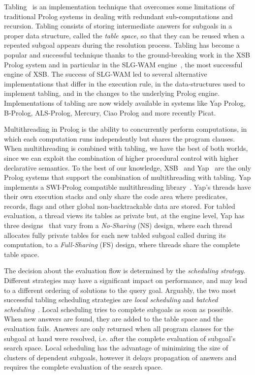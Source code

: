 \documentclass{llncs}
\begin{document}
Tabling~\cite{Chen-96} is an implementation technique that overcomes
some limitations of traditional Prolog systems in dealing with
redundant sub-computations and recursion. Tabling consists of storing
intermediate answers for subgoals in a proper data structure, called
the \emph{table space}, so that they can be reused when a repeated
subgoal appears during the resolution process. Tabling has become a
popular and successful technique thanks to the ground-breaking work in
the XSB Prolog system and in particular in the SLG-WAM
engine~\cite{Sagonas-98}, the most successful engine of XSB. The
success of SLG-WAM led to several alternative implementations that
differ in the execution rule, in the data-structures used to implement
tabling, and in the changes to the underlying Prolog
engine. Implementations of tabling are now widely available in systems
like Yap Prolog, B-Prolog, ALS-Prolog, Mercury, Ciao Prolog and more
recently Picat.

Multithreading in Prolog is the ability to concurrently perform
computations, in which each computation runs independently but shares
the program clauses. When multithreading is combined with tabling, we
have the best of both worlds, since we can exploit the combination of
higher procedural control with higher declarative semantics. To the
best of our knowledge, XSB~\cite{Marques-08} and Yap~\cite{Areias-12a}
are the only Prolog systems that support the combination of
multithreading with tabling. Yap implements a SWI-Prolog compatible
multithreading library~\cite{Wielemaker-03}. Yap's threads have their
own execution stacks and only share the code area where predicates,
records, flags and other global non-backtrackable data are stored. For
tabled evaluation, a thread views its tables as private but, at the
engine level, Yap has three designs~\cite{Areias-12a} that vary from a
\emph{No-Sharing} (NS) design, where each thread allocates fully
private tables for each new tabled subgoal called during its
computation, to a \emph{Full-Sharing} (FS) design, where threads share
the complete table space.

The decision about the evaluation flow is determined by the
\emph{scheduling strategy}. Different strategies may have a
significant impact on performance, and may lead to a different
ordering of solutions to the query goal. Arguably, the two most
successful tabling scheduling strategies are \emph{local scheduling}
and \emph{batched scheduling}~\cite{Freire-96}. Local scheduling tries
to complete subgoals as soon as possible. When new answers are found,
they are added to the table space and the evaluation fails. Answers
are only returned when all program clauses for the subgoal at hand
were resolved, i.e. after the complete evaluation of subgoal's search
space. Local scheduling has the advantage of minimizing the size of
clusters of dependent subgoals, however it delays propagation of
answers and requires the complete evaluation of the search
space. 
\end{document}
